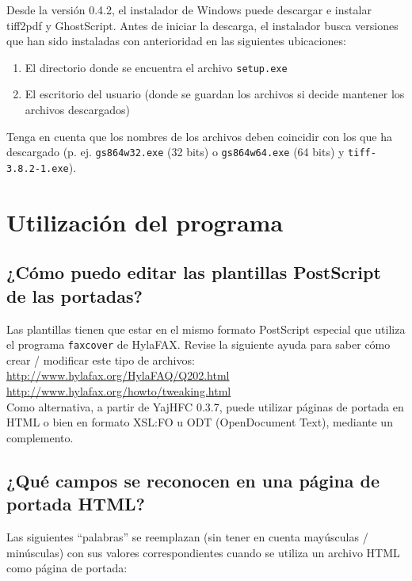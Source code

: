 \documentclass[a4paper,10pt]{scrartcl}
\begin{document}
Desde la versión 0.4.2, el instalador de Windows puede descargar e instalar tiff2pdf y GhostScript.
Antes de iniciar la descarga, el instalador busca versiones que han sido instaladas con anterioridad en las siguientes ubicaciones:
\begin{enumerate}
 \item El directorio donde se encuentra el archivo \texttt{setup.exe}
 \item El escritorio del usuario (donde se guardan los archivos si decide mantener los archivos descargados)
\end{enumerate}

Tenga en cuenta que los nombres de los archivos deben coincidir con los que ha descargado (p. ej. \texttt{gs864w32.exe} (32 bits) o \texttt{gs864w64.exe} (64 bits) y \texttt{tiff-3.8.2-1.exe}).

\section{Utilización del programa}	

\subsection{¿Cómo puedo editar las plantillas PostScript de las portadas?}
Las plantillas tienen que estar en el mismo formato PostScript especial 
que utiliza el programa \texttt{faxcover} de HylaFAX. Revise la siguiente ayuda 
para saber cómo crear / modificar este tipo de archivos: \\
\url{http://www.hylafax.org/HylaFAQ/Q202.html}\\
\url{http://www.hylafax.org/howto/tweaking.html}\\

Como alternativa, a partir de YajHFC 0.3.7, puede utilizar páginas de portada en HTML o bien en formato XSL:FO u ODT (OpenDocument Text), mediante un complemento.

\subsection{¿Qué campos se reconocen en una página de portada HTML?}

Las siguientes ``palabras'' se reemplazan (sin tener en cuenta mayúsculas / minúsculas) con sus valores correspondientes cuando se utiliza un archivo HTML como página de portada:
\end{document}
